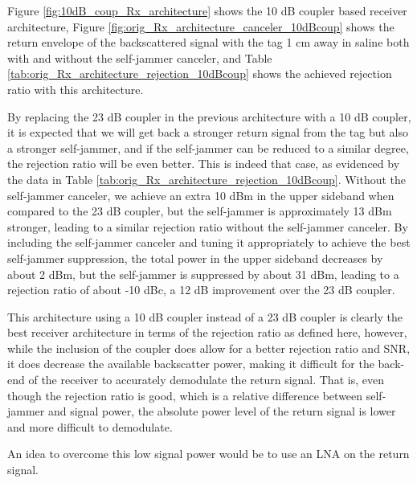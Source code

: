 \documentclass[12pt,onecolumn,titlepage]{article}
\begin{document}
Figure \ref{fig:10dB_coup_Rx_architecture} shows the 10 dB coupler based receiver architecture, Figure \ref{fig:orig_Rx_architecture_canceler_10dBcoup} shows the return envelope of the backscattered signal with the tag 1 cm away in saline both with and without the self-jammer canceler, and Table \ref{tab:orig_Rx_architecture_rejection_10dBcoup} shows the achieved rejection ratio with this architecture. 

By replacing the 23 dB coupler in the previous architecture with a 10 dB coupler, it is expected that we will get back a stronger return signal from the tag but also a stronger self-jammer, and if the self-jammer can be reduced to a similar degree, the rejection ratio will be even better. This is indeed that case, as evidenced by the data in Table \ref{tab:orig_Rx_architecture_rejection_10dBcoup}. Without the self-jammer canceler, we achieve an extra 10 dBm in the upper sideband when compared to the 23 dB coupler, but the self-jammer is approximately 13 dBm stronger, leading to a similar rejection ratio without the self-jammer canceler. By including the self-jammer canceler and tuning it appropriately to achieve the best self-jammer suppression, the total power in the upper sideband decreases by about 2 dBm, but the self-jammer is suppressed by about 31 dBm, leading to a rejection ratio of about -10 dBc, a 12 dB improvement over the 23 dB coupler. 

This architecture using a 10 dB coupler instead of a 23 dB coupler is clearly the best receiver architecture in terms of the rejection ratio as defined here, however, while the inclusion of the coupler does allow for a better rejection ratio and SNR, it does decrease the available backscatter power, making it difficult for the back-end of the receiver to accurately demodulate the return signal. That is, even though the rejection ratio is good, which is a relative difference between self-jammer and signal power, the absolute power level of the return signal is lower and more difficult to demodulate.

An idea to overcome this low signal power would be to use an LNA on the return signal.
\end{document}
